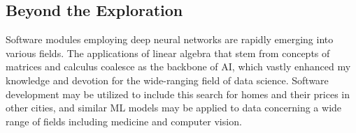 \documentclass[12pt,a4paper]{article}
\begin{document}
\subsection{Beyond the Exploration}
Software modules employing deep neural networks are rapidly emerging into various fields. The applications of linear algebra that stem from concepts of matrices and calculus coalesce as the backbone of AI, which vastly enhanced my knowledge and devotion for the wide-ranging field of data science. Software development may be utilized to include this search for homes and their prices in other cities, and similar ML models may be applied to data concerning a wide range of fields including medicine and computer vision.



























\newpage
\end{document}
